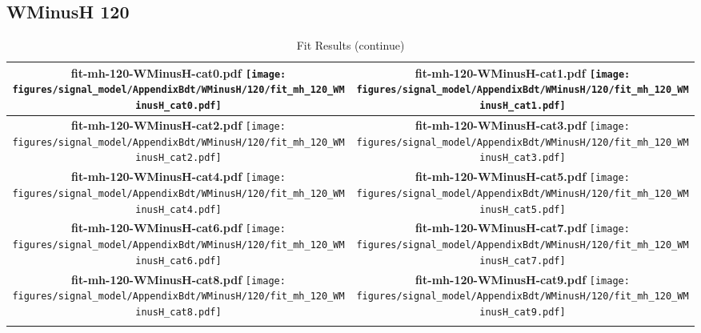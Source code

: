 \subsection{WMinusH 120}
\begin{longtable}{|c|c|}
\caption{Fit Results}
\endfirsthead
\caption{Fit Results (continue)}
\endhead
\hline
\parbox{0.47\textwidth}{
\centering
{\bfseries fit-mh-120-WMinusH-cat0.pdf}
\texttt{[image: figures/signal\_model/AppendixBdt/WMinusH/120/fit\_mh\_120\_WMinusH\_cat0.pdf]}
}
 & \parbox{0.47\textwidth}{
\centering
{\bfseries fit-mh-120-WMinusH-cat1.pdf}
\texttt{[image: figures/signal\_model/AppendixBdt/WMinusH/120/fit\_mh\_120\_WMinusH\_cat1.pdf]}
}
 \\
\hline
\parbox{0.47\textwidth}{
\centering
{\bfseries fit-mh-120-WMinusH-cat2.pdf}
\texttt{[image: figures/signal\_model/AppendixBdt/WMinusH/120/fit\_mh\_120\_WMinusH\_cat2.pdf]}
}
 & \parbox{0.47\textwidth}{
\centering
{\bfseries fit-mh-120-WMinusH-cat3.pdf}
\texttt{[image: figures/signal\_model/AppendixBdt/WMinusH/120/fit\_mh\_120\_WMinusH\_cat3.pdf]}
}
 \\
\hline
\parbox{0.47\textwidth}{
\centering
{\bfseries fit-mh-120-WMinusH-cat4.pdf}
\texttt{[image: figures/signal\_model/AppendixBdt/WMinusH/120/fit\_mh\_120\_WMinusH\_cat4.pdf]}
}
 & \parbox{0.47\textwidth}{
\centering
{\bfseries fit-mh-120-WMinusH-cat5.pdf}
\texttt{[image: figures/signal\_model/AppendixBdt/WMinusH/120/fit\_mh\_120\_WMinusH\_cat5.pdf]}
}
 \\
\hline
\parbox{0.47\textwidth}{
\centering
{\bfseries fit-mh-120-WMinusH-cat6.pdf}
\texttt{[image: figures/signal\_model/AppendixBdt/WMinusH/120/fit\_mh\_120\_WMinusH\_cat6.pdf]}
}
 & \parbox{0.47\textwidth}{
\centering
{\bfseries fit-mh-120-WMinusH-cat7.pdf}
\texttt{[image: figures/signal\_model/AppendixBdt/WMinusH/120/fit\_mh\_120\_WMinusH\_cat7.pdf]}
}
 \\
\hline
\parbox{0.47\textwidth}{
\centering
{\bfseries fit-mh-120-WMinusH-cat8.pdf}
\texttt{[image: figures/signal\_model/AppendixBdt/WMinusH/120/fit\_mh\_120\_WMinusH\_cat8.pdf]}
}
 & \parbox{0.47\textwidth}{
\centering
{\bfseries fit-mh-120-WMinusH-cat9.pdf}
\texttt{[image: figures/signal\_model/AppendixBdt/WMinusH/120/fit\_mh\_120\_WMinusH\_cat9.pdf]}
}
 \\
\hline
\parbox{0.47\textwidth}{
\centering
}
\end{longtable}
